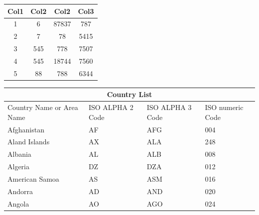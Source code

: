 \documentclass{article}
\begin{document}
\begin{center}
  \begin{tabular}{||c c c c||}
    \hline
    Col1 & Col2 & Col2  & Col3 \\[0.5ex]
    \hline\hline
    1    & 6    & 87837 & 787 \\
    \hline
    2    & 7    & 78    & 5415 \\
    \hline
    3    & 545  & 778   & 7507 \\
    \hline
    4    & 545  & 18744 & 7560 \\
    \hline
    5    & 88   & 788   & 6344 \\[1ex]
    \hline
  \end{tabular}
\end{center}

\begin{tabular}{ |p{3cm}||p{3cm}|p{3cm}|p{3cm}| }
  \hline
  \multicolumn{4}{|c|}{Country List} \\
  \hline
  Country Name or Area Name& ISO ALPHA 2 Code &ISO ALPHA 3 Code&ISO numeric Code\\
  \hline
  Afghanistan              & AF               &AFG             & 004\\
  Aland Islands            & AX               & ALA            &248\\
  Albania                  &AL                & ALB            & 008\\
  Algeria                  &DZ                & DZA            & 012\\
  American Samoa           & AS               & ASM            &016\\
  Andorra                  & AD               & AND            &020\\
  Angola                   & AO               & AGO            &024\\
  \hline
\end{tabular}
\end{document}
